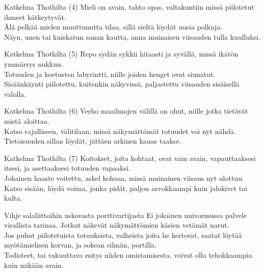 \documentclass[a4paper,12pt]{article}
\begin{document}
\begin{biginfobox}{Katkelma Thothilta (4)}
Mieli on avain, tahto opas, valtakuntiin missä piilotetut ihmeet kätkeytyvät.\\
Älä pelkää mielen muuttunutta tilaa, sillä sieltä löydät uusia polkuja.\\
Näyn, unen tai kuiskatun sanan kautta, anna muinaisen viisauden tulla kuulluksi.
\end{biginfobox}

\begin{biginfobox}{Katkelma Thothilta (5)}
Repo sydän sykkii hitaasti ja syvällä, missä ikätön ymmärrys nukkuu.\\
Totuuden ja koetusten labyrintti, niille joiden henget ovat siunatut.\\
Sisäänkäynti piilotettu, kuitenkin näkyvissä, paljastettu viisauden sisäisellä valolla.
\end{biginfobox}

\begin{biginfobox}{Katkelma Thothilta (6)}
Verho maailmojen välillä on ohut, niille jotka tietävät mistä aloittaa.\\
Katso rajalliseen, välitilaan, missä näkymättömät totuudet voi nyt nähdä.\\
Tietoisuuden sillan löydät, jättäen arkinen kauas taakse.
\end{biginfobox}

\begin{biginfobox}{Katkelma Thothilta (7)}
Koitokset, joita kohtaat, ovat vain avain, vapauttaaksesi itsesi, ja asettaaksesi totuuden vapaaksi.\\
Jokainen haaste voitettu, askel kohoaa, missä muinainen viisaus nyt ulottuu.\\
Katso sisään, löydä voima, jonka pidät, paljon arvokkaampi kuin jalokivet tai kulta.
\end{biginfobox}

\begin{biginfobox}{Vihje salaliittoihin uskovasta porttivartijasta}
Ei jokainen univormussa palvele virallista tarinaa. Jotkut näkevät näkymättömien käsien vetämät narut.\\
Jos puhut piilotetuista totuuksista, valheista joita he kertovat, saatat löytää myötämielisen korvan, ja sokean silmän, portilla.\\
Todisteet, tai vakuuttava esitys niiden omistamisesta, voivat olla tehokkaampia kuin mikään avain.
\end{biginfobox}
\end{document}
